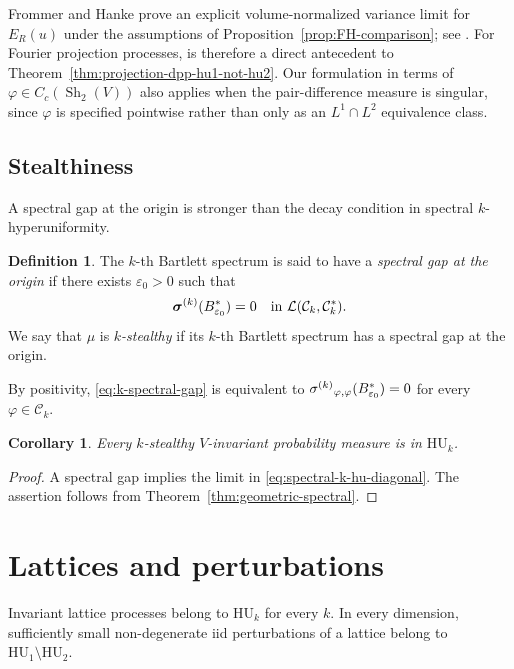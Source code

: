 \documentclass[11pt,reqno,a4paper]{amsart}
\numberwithin{equation}{section}
\theoremstyle{compact}
\newtheorem{corollary}[corollary]{Corollary}
\theoremstyle{definition}
\newtheorem{definition}[definition]{Definition}
\theoremstyle{definition}
\newcommand{\HU}{\mathrm{HU}}
\newcommand{\Sh}{\operatorname{Sh}}
\newcommand{\sigmak}{\smash[t]{\sigma^{(k)}}}
\newcommand{\bsigmak}{\smash[t]{\boldsymbol{\sigma}^{(k)}}}
\begin{document}
Frommer and Hanke prove an explicit volume-normalized variance limit for
$E_R(u)$ under the assumptions of Proposition~\ref{prop:FH-comparison}; see
\cite[Proposition~4.1]{FH26}.  For Fourier projection processes,
\cite[Theorem~4.2]{FH26} is therefore a direct antecedent to
Theorem~\ref{thm:projection-dpp-hu1-not-hu2}.  Our formulation in terms of
$\varphi\in C_c(\Sh_2(V))$ also applies when the pair-difference measure is
singular, since $\varphi$ is specified pointwise rather than only as an
$L^1\cap L^2$ equivalence class.

\subsection{Stealthiness}
\label{subsec:stealthiness}

A spectral gap at the origin is stronger than the decay condition in spectral
$k$-hyperuniformity.

\begin{definition}\label{def:k-stealthy}
The $k$-th Bartlett spectrum is said to have a \emph{spectral gap at the
origin} if there exists $\varepsilon_0>0$ such that
\begin{equation}\label{eq:k-spectral-gap}
  \bsigmak(B_{\varepsilon_0}^*)=0
  \quad\text{in }\mathcal L(\mathcal C_k,\mathcal C_k^*).
\end{equation}
We say that $\mu$ is \emph{$k$-stealthy} if its $k$-th Bartlett spectrum has
a spectral gap at the origin.
\end{definition}

By positivity, \eqref{eq:k-spectral-gap} is equivalent to
$\sigmak_{\varphi,\varphi}(B_{\varepsilon_0}^*)=0$ for every
$\varphi\in\mathcal C_k$.

\begin{corollary}\label{cor:stealthy-implies-hu}
Every $k$-stealthy $V$-invariant probability measure is in $\HU_k$.
\end{corollary}

\begin{proof}
A spectral gap implies the limit in \eqref{eq:spectral-k-hu-diagonal}.
The assertion follows from Theorem~\ref{thm:geometric-spectral}.
\end{proof}

\section{Lattices and perturbations}
\label{sec:lattices}

Invariant lattice processes belong to $\HU_k$ for every $k$.  In every
dimension, sufficiently small non-degenerate iid perturbations of a lattice
belong to $\HU_1\setminus\HU_2$.
\end{document}
